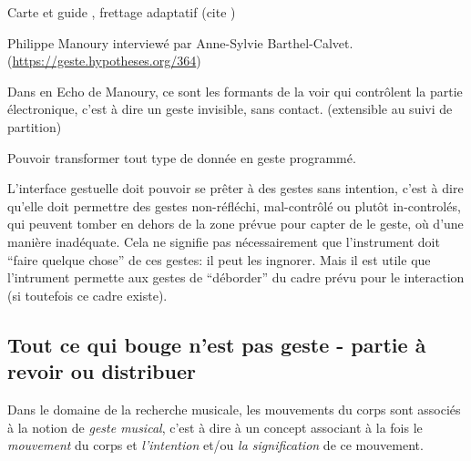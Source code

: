 Carte et guide , frettage adaptatif (cite \cite{goudard_playing_2014})


 Philippe Manoury interviewé par Anne-Sylvie Barthel-Calvet. (\url{https://geste.hypotheses.org/364})

Dans en Echo de Manoury, ce sont les formants de la voir qui contrôlent la partie électronique, c'est à dire un geste invisible, sans contact. (extensible au suivi de partition)


Pouvoir transformer tout type de donnée en geste programmé.


L'interface gestuelle doit pouvoir se prêter à des gestes sans intention, c'est à dire qu'elle doit permettre des gestes non-réfléchi, mal-contrôlé ou plutôt in-controlés, qui peuvent tomber en dehors de la zone prévue pour capter de le geste, où d'une manière inadéquate. Cela ne signifie pas nécessairement que l'instrument doit ``faire quelque chose'' de ces gestes: il peut les ingnorer.  Mais il est utile que l'intrument permette aux gestes de ``déborder'' du cadre prévu pour le interaction (si toutefois ce cadre existe).


\subsection*{Tout ce qui bouge n'est pas geste - partie à revoir ou distribuer}

Dans le domaine de la recherche musicale, les mouvements du corps sont associés à la notion de \textit{geste musical}, c'est à dire à un concept associant à la fois le \textit{mouvement} du corps et \textit{l'intention} et/ou \textit{la signification} de ce mouvement. 

